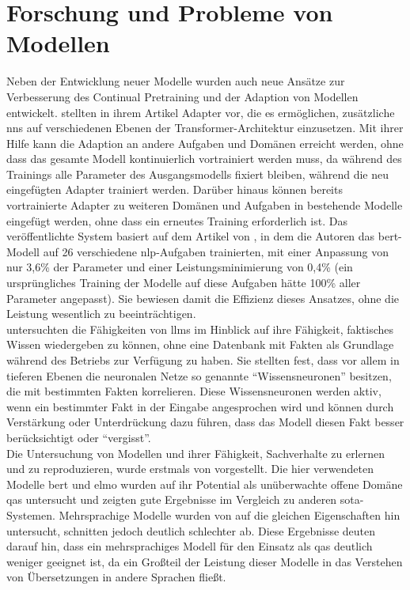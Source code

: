 \section{Forschung und Probleme von Modellen}
Neben der Entwicklung neuer Modelle wurden auch neue Ansätze zur Verbesserung des Continual Pretraining und der Adaption von Modellen entwickelt. 
\citet{adapterhub} stellten in ihrem Artikel Adapter vor, die es ermöglichen, zusätzliche \ac{nn}s auf verschiedenen Ebenen der Transformer-Architektur einzusetzen.
Mit ihrer Hilfe kann die Adaption an andere Aufgaben und Domänen erreicht werden, ohne dass das gesamte Modell kontinuierlich vortrainiert werden muss, da während des Trainings alle Parameter des Ausgangsmodells fixiert bleiben, während die neu eingefügten Adapter trainiert werden.
Darüber hinaus können bereits vortrainierte Adapter zu weiteren Domänen und Aufgaben in bestehende Modelle eingefügt werden, ohne dass ein erneutes Training erforderlich ist.
Das veröffentlichte System basiert auf dem Artikel von \citet{adapter_build_on}, in dem die Autoren das \ac{bert}-Modell auf 26 verschiedene \ac{nlp}-Aufgaben trainierten, mit einer Anpassung von nur 3,6\% der Parameter und einer Leistungsminimierung von 0,4\% (ein ursprüngliches Training der Modelle auf diese Aufgaben hätte 100\% aller Parameter angepasst). Sie bewiesen damit die Effizienz dieses Ansatzes, ohne die Leistung wesentlich zu beeinträchtigen.\\

\citet{knowledge_neurons} untersuchten die Fähigkeiten von \ac{llm}s im Hinblick auf ihre Fähigkeit, faktisches Wissen wiedergeben zu können, ohne eine Datenbank mit Fakten als Grundlage während des Betriebs zur Verfügung zu haben.
Sie stellten fest, dass vor allem in tieferen Ebenen die neuronalen Netze so genannte \enquote{Wissensneuronen} besitzen, die mit bestimmten Fakten korrelieren.
Diese Wissensneuronen werden aktiv, wenn ein bestimmter Fakt in der Eingabe angesprochen wird und können durch Verstärkung oder Unterdrückung dazu führen, dass das Modell diesen Fakt besser berücksichtigt oder \enquote{vergisst}.\\

Die Untersuchung von Modellen und ihrer Fähigkeit, Sachverhalte zu erlernen und zu reproduzieren, wurde erstmals von \citet{knowledge_base} vorgestellt.
Die hier verwendeten Modelle \ac{bert} und \ac{elmo} wurden auf ihr Potential als unüberwachte offene Domäne \ac{qas} untersucht und zeigten gute Ergebnisse im Vergleich zu anderen \ac{sota}-Systemen.
Mehrsprachige Modelle wurden von \citet{xfactr} auf die gleichen Eigenschaften hin untersucht, schnitten jedoch deutlich schlechter ab. Diese Ergebnisse deuten darauf hin, dass ein mehrsprachiges Modell für den Einsatz als \ac{qas} deutlich weniger geeignet ist, da ein Großteil der Leistung dieser Modelle in das Verstehen von Übersetzungen in andere Sprachen fließt.\\

